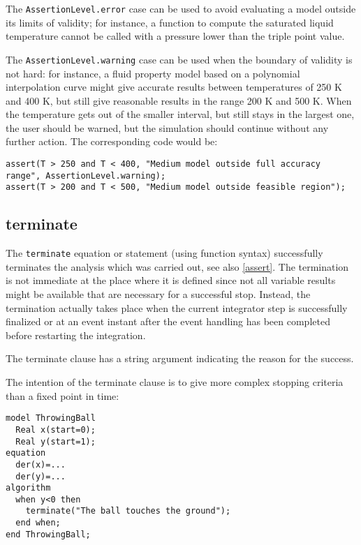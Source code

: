 \begin{nonnormative}
The \lstinline!AssertionLevel.error! case can be used to avoid evaluating a
model outside its limits of validity; for instance, a function to
compute the saturated liquid temperature cannot be called with a
pressure lower than the triple point value.

The \lstinline!AssertionLevel.warning! case can be used when the boundary of
validity is not hard: for instance, a fluid property model based on a
polynomial interpolation curve might give accurate results between
temperatures of 250 K and 400 K, but still give reasonable results in
the range 200 K and 500 K. When the temperature gets out of the smaller
interval, but still stays in the largest one, the user should be warned,
but the simulation should continue without any further action. The
corresponding code would be:
\begin{lstlisting}[language=modelica]
assert(T > 250 and T < 400, "Medium model outside full accuracy range", AssertionLevel.warning);
assert(T > 200 and T < 500, "Medium model outside feasible region");
\end{lstlisting}
\end{nonnormative}

\subsection{terminate}

The \lstinline!terminate! equation or statement (using function
syntax) successfully terminates the analysis which was carried out,
see also \autoref{assert}. The termination is not immediate at the place
where it is defined since not all variable results might be available
that are necessary for a successful stop. Instead, the termination
actually takes place when the current integrator step is successfully
finalized or at an event instant after the event handling has been
completed before restarting the integration.

The terminate clause has a string argument indicating the reason for the success.

\begin{example}
The intention of the terminate clause is to give more complex stopping criteria than a fixed point in time:
\begin{lstlisting}[language=modelica]
model ThrowingBall
  Real x(start=0);
  Real y(start=1);
equation
  der(x)=...
  der(y)=...
algorithm
  when y<0 then
    terminate("The ball touches the ground");
  end when;
end ThrowingBall;
\end{lstlisting}
\end{example}

